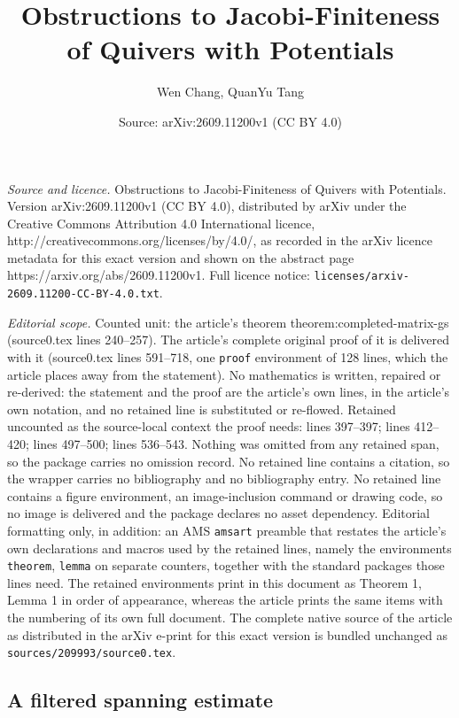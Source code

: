 \documentclass[10pt,a4paper]{amsart}
\title{Obstructions to Jacobi-Finiteness of Quivers with Potentials}
\author{Wen Chang, QuanYu Tang}
\date{Source: arXiv:2609.11200v1 (CC BY 4.0)}
\begin{document}
\maketitle

\noindent\emph{Source and licence.} Obstructions to Jacobi-Finiteness of Quivers with Potentials. Version arXiv:2609.11200v1 (CC BY 4.0), distributed by arXiv under the Creative Commons Attribution 4.0 International licence, http://creativecommons.org/licenses/by/4.0/, as recorded in the arXiv licence metadata for this exact version and shown on the abstract page https://arxiv.org/abs/2609.11200v1. Full licence notice: \texttt{licenses/arxiv-2609.11200-CC-BY-4.0.txt}.\par\smallskip

\noindent\textit{Editorial scope.} Counted unit: the article's theorem theorem:completed-matrix-gs (source0.tex lines 240--257). The article's complete original proof of it is delivered with it (source0.tex lines 591--718, one \texttt{proof} environment of 128 lines, which the article places away from the statement). No mathematics is written, repaired or re-derived: the statement and the proof are the article's own lines, in the article's own notation, and no retained line is substituted or re-flowed.  Retained uncounted as the source-local context the proof needs: lines 397--397; lines 412--420; lines 497--500; lines 536--543.  Nothing was omitted from any retained span, so the package carries no omission record.  No retained line contains a citation, so the wrapper carries no bibliography and no bibliography entry.  No retained line contains a figure environment, an image-inclusion command or drawing code, so no image is delivered and the package declares no asset dependency.  Editorial formatting only, in addition: an AMS \texttt{amsart} preamble that restates the article's own declarations and macros used by the retained lines, namely the environments \texttt{theorem}, \texttt{lemma} on separate counters, together with the standard packages those lines need.  The retained environments print in this document as Theorem 1, Lemma 1 in order of appearance, whereas the article prints the same items with the numbering of its own full document.  The complete native source of the article as distributed in the arXiv e-print for this exact version is bundled unchanged as \texttt{sources/209993/source0.tex}.
	\subsection{A filtered spanning estimate}\label{subsec:filtered-spanning-estimate}
\end{document}

